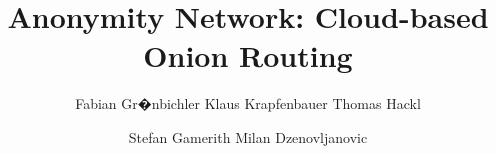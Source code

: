 \documentclass{acm_proc_article-sp}
\begin{document}
\title{Anonymity Network: Cloud-based Onion Routing}
%
%
%
%
%

%
\author{
%
%
\alignauthor
Fabian Gr�nbichler
\alignauthor
Klaus Krapfenbauer
\alignauthor
Thomas Hackl
\and  %
\alignauthor 
Stefan Gamerith
\alignauthor 
Milan Dzenovljanovic
}
\end{document}

